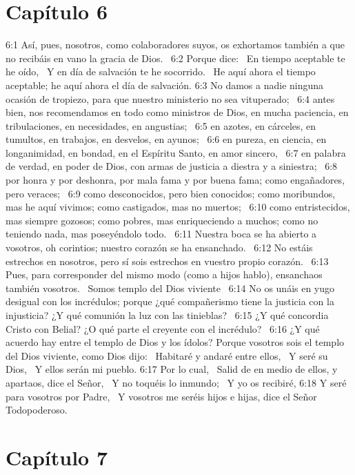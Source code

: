 \section*{Capítulo 6}

6:1 Así, pues, nosotros, como colaboradores suyos, os exhortamos también a que no recibáis en vano la gracia de Dios.  
6:2 Porque dice:  
En tiempo aceptable te he oído,  
Y en día de salvación te he socorrido.  
He aquí ahora el tiempo aceptable; he aquí ahora el día de salvación. 
6:3 No damos a nadie ninguna ocasión de tropiezo, para que nuestro ministerio no sea vituperado;  
6:4 antes bien, nos recomendamos en todo como ministros de Dios, en mucha paciencia, en tribulaciones, en necesidades, en angustias;  
6:5 en azotes, en cárceles, en tumultos, en trabajos, en desvelos, en ayunos;  
6:6 en pureza, en ciencia, en longanimidad, en bondad, en el Espíritu Santo, en amor sincero,  
6:7 en palabra de verdad, en poder de Dios, con armas de justicia a diestra y a siniestra;  
6:8 por honra y por deshonra, por mala fama y por buena fama; como engañadores, pero veraces;  
6:9 como desconocidos, pero bien conocidos; como moribundos, mas he aquí vivimos; como castigados, mas no muertos;  
6:10 como entristecidos, mas siempre gozosos; como pobres, mas enriqueciendo a muchos; como no teniendo nada, mas poseyéndolo todo.  
6:11 Nuestra boca se ha abierto a vosotros, oh corintios; nuestro corazón se ha ensanchado.  
6:12 No estáis estrechos en nosotros, pero sí sois estrechos en vuestro propio corazón.  
6:13 Pues, para corresponder del mismo modo (como a hijos hablo), ensanchaos también vosotros.  
Somos templo del Dios viviente  
6:14 No os unáis en yugo desigual con los incrédulos; porque ¿qué compañerismo tiene la justicia con la injusticia? ¿Y qué comunión la luz con las tinieblas?  
6:15 ¿Y qué concordia Cristo con Belial? ¿O qué parte el creyente con el incrédulo?  
6:16 ¿Y qué acuerdo hay entre el templo de Dios y los ídolos? Porque vosotros sois el templo del Dios viviente, como Dios dijo:  
Habitaré y andaré entre ellos,  
Y seré su Dios,  
Y ellos serán mi pueblo. 
6:17 Por lo cual,  
Salid de en medio de ellos, y apartaos, dice el Señor,  
Y no toquéis lo inmundo;  
Y yo os recibiré, 
6:18 Y seré para vosotros por Padre,  
Y vosotros me seréis hijos e hijas, dice el Señor Todopoderoso. 
\section*{Capítulo 7 }

